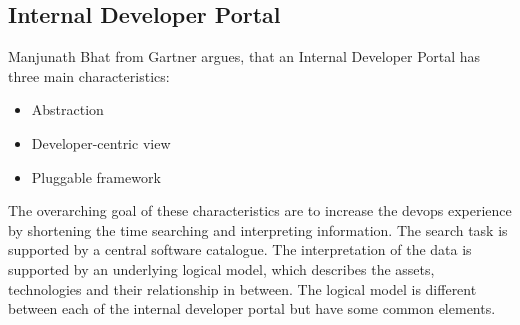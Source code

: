 \documentclass[a4paper,12pt]{article}
\begin{document}
    \subsection{Internal Developer Portal}
    \label{subsec:vpportal}
    Manjunath Bhat from Gartner argues, that an Internal Developer Portal has three main characteristics\parencite{gartner}:
    \begin{itemize}
        \item Abstraction
        \item Developer-centric view
        \item Pluggable framework
    \end{itemize}
    The overarching goal of these characteristics are to increase the devops experience by shortening the time searching
    and interpreting information.
    The search task is supported by a central software catalogue.
    The interpretation of the data is supported by an underlying logical model, which describes the assets, technologies
    and their relationship in between.
    The logical model is different between each of the internal developer portal but have some common elements.
\end{document}
